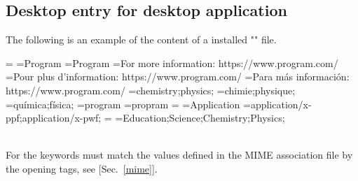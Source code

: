 \subsection{Desktop entry for desktop application}
\label{desktop}

The following is an example of the content of a installed "" file. 
{\scriptsize{
\begin{script}
=
=Program
=Program
=For more information: https://www.program.com/
\aqua{[fr]}=Pour plus d'information: https://www.program.com/
\aqua{[es]}=Para más información: https://www.program.com/
=chemistry;physics;
\aqua{[fr]}=chimie;physique;
\aqua{[es]}=química;física;
=program 
=propram
=
=Application
=application/x-ppf;application/x-pwf;
=
=Education;Science;Chemistry;Physics;
\end{script}
}}
\\
\noindent For  the keywords must match the values defined in the MIME association file by the \dbtt{>}
 opening tags, see [Sec.~\ref{mime}].

\clearpage
